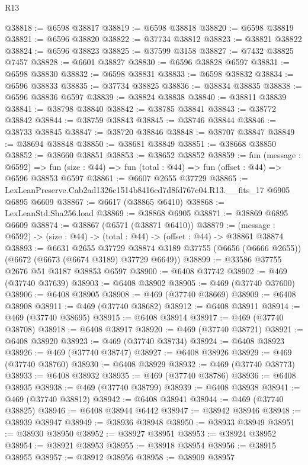 \begin{lexlean}{R13}
\begin{coremodule}
@38818 := @6598 @38817
@38819 := @6598 @38818
@38820 := @6598 @38819
@38821 := @6596 @38820
@38822 := @37734 @38812
@38823 := @38821 @38822
@38824 := @6596 @38823
@38825 := @37599 @3158
@38827 := @7432 @38825 @7457
@38828 := @6601 @38827
@38830 := @6596 @38828 @6597
@38831 := @6598 @38830
@38832 := @6598 @38831
@38833 := @6598 @38832
@38834 := @6596 @38833
@38835 := @37734 @38825
@38836 := @38834 @38835
@38838 := @6596 @38836 @6597
@38839 := @38824 @38838
@38840 := @38811 @38839
@38841 := @38798 @38840
@38842 := @38785 @38841
@38843 := @38772 @38842
@38844 := @38759 @38843
@38845 := @38746 @38844
@38846 := @38733 @38845
@38847 := @38720 @38846
@38848 := @38707 @38847
@38849 := @38694 @38848
@38850 := @38681 @38849
@38851 := @38668 @38850
@38852 := @38660 @38851
@38853 := @38652 @38852
@38859 := fun (message : @6592) =>
  fun (size : @44) => fun (total : @44) => fun (offset : @44) => @6596 @38853 @6597
@38861 := @6607 @2655 @37729
@38865 := LexLeanPreserve.Cab2ad1326c1514b8416cd7d8fd767c04.R13.__fits_17 @6905 @6895 @6609
@38867 := @6617 (@38865 @6410)
@38868 := LexLeanStd.Sha256.load
@38869 := @38868 @6905
@38871 := @38869 @6895 @6609
@38874 := @38867 (@6571 (@38871 @6410))
@38879 := (message : @6592) -> (size : @44) -> (total : @44) -> (offset : @44) -> @38861 @38874
@38893 := @6631
    @2655
    @37729
    @38874
    @3189
    @37755
    (@6656 (@6666 @2655))
    (@6672 (@6673 (@6674 @3189) @37729 @6649))
@38899 := @33586 @37755 @2676 @51 @3187 @38853 @6597
@38900 := @6408 @37742
@38902 := @469 (@37740 @37639)
@38903 := @6408 @38902
@38905 := @469 (@37740 @37600)
@38906 := @6408 @38905
@38908 := @469 (@37740 @38669)
@38909 := @6408 @38908
@38911 := @469 (@37740 @38682)
@38912 := @6408 @38911
@38914 := @469 (@37740 @38695)
@38915 := @6408 @38914
@38917 := @469 (@37740 @38708)
@38918 := @6408 @38917
@38920 := @469 (@37740 @38721)
@38921 := @6408 @38920
@38923 := @469 (@37740 @38734)
@38924 := @6408 @38923
@38926 := @469 (@37740 @38747)
@38927 := @6408 @38926
@38929 := @469 (@37740 @38760)
@38930 := @6408 @38929
@38932 := @469 (@37740 @38773)
@38933 := @6408 @38932
@38935 := @469 (@37740 @38786)
@38936 := @6408 @38935
@38938 := @469 (@37740 @38799)
@38939 := @6408 @38938
@38941 := @469 (@37740 @38812)
@38942 := @6408 @38941
@38944 := @469 (@37740 @38825)
@38946 := @6408 @38944 @6442
@38947 := @38942 @38946
@38948 := @38939 @38947
@38949 := @38936 @38948
@38950 := @38933 @38949
@38951 := @38930 @38950
@38952 := @38927 @38951
@38953 := @38924 @38952
@38954 := @38921 @38953
@38955 := @38918 @38954
@38956 := @38915 @38955
@38957 := @38912 @38956
@38958 := @38909 @38957

\end{coremodule}
\end{lexlean}
